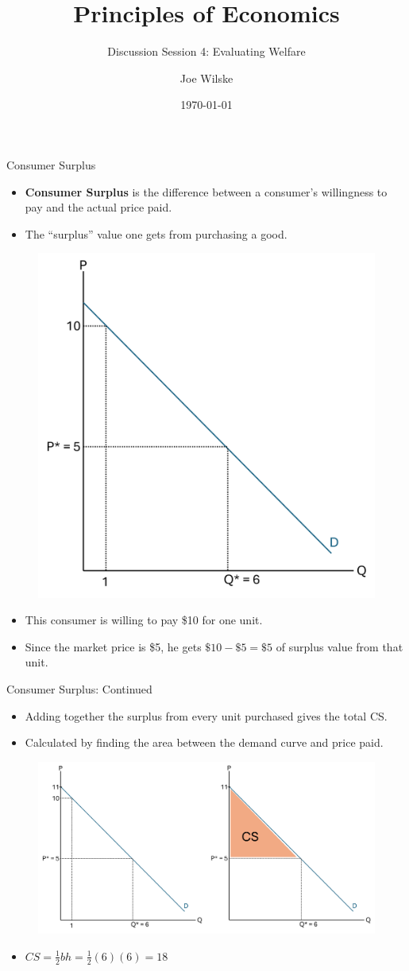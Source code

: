 \documentclass[9pt, handout]{beamer}
\title{Principles of Economics}
\subtitle{Discussion Session 4: Evaluating Welfare}
\author{Joe Wilske}
\institute{Boston College}
\date{\today}
\begin{document}
\frame{\titlepage}

\begin{frame}{Consumer Surplus}
    \begin{itemize}
        \item \textbf{Consumer Surplus} is the difference between a consumer's willingness to pay and the actual price paid.
        \item The ``surplus'' value one gets from purchasing a good.
    \end{itemize}
    \begin{figure}
        \centering
        \includegraphics[width=0.4\linewidth]{Picture1.png}
    \end{figure}
    \begin{itemize}
        \item This consumer is willing to pay \$10 for one unit.
        \item Since the market price is \$5, he gets $\$10 - \$5 = \$5$ of surplus value from that unit.
    \end{itemize}
\end{frame}

\begin{frame}{Consumer Surplus: Continued}
    \begin{itemize}
        \item Adding together the surplus from every unit purchased gives the total CS.
        \item Calculated by finding the area between the demand curve and price paid.
    \end{itemize}
    \begin{figure}
        \centering
        \includegraphics[width=.85\linewidth]{Picture2.png}
    \end{figure}
    \begin{itemize}
        \item $CS = \frac{1}{2}bh = \frac{1}{2}(6)(6) = 18$
    \end{itemize}
\end{frame}
\end{document}
